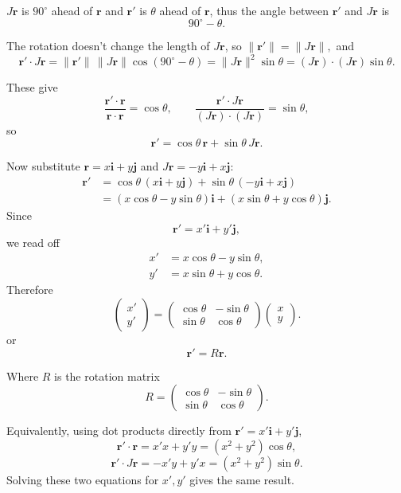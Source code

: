\documentclass[a4paper,11pt]{article}
\begin{document}
\(J\mathbf r\) is \(90^\circ\) ahead of \(\mathbf r\) and
\(\mathbf r'\) is \(\theta\) ahead of \(\mathbf r\), thus
the angle between \(\mathbf r'\) and \(J\mathbf r\) is
\[
90^\circ-\theta.
\]

The rotation doesn't change the length of \(J\mathbf r\), so
\(\|\mathbf r'\| = \|J\mathbf r\|,\) and
\[
\mathbf r'\cdot J\mathbf r
=
\|\mathbf r'\|\,\|J\mathbf r\| \cos(90^\circ-\theta)
=
\|J\mathbf r\|^2 \sin\theta
=
(J\mathbf r)\cdot(J\mathbf r) \sin\theta.
\]

These give
\[
\frac{\mathbf r'\cdot \mathbf r}{\mathbf r\cdot \mathbf r}
=
\cos\theta,
\qquad
\frac{\mathbf r'\cdot J\mathbf r}{(J\mathbf r)\cdot(J\mathbf r)}
=
\sin\theta,
\]
so
\[
\mathbf r'=\cos\theta\,\mathbf r+\sin\theta\,J\mathbf r.
\]

Now substitute \(\mathbf r=x\mathbf i+y\mathbf j\) and \(J\mathbf r=-y\mathbf i+x\mathbf j\):
\[
\begin{aligned}
\mathbf r' &=\cos\theta\,(x\mathbf i+y\mathbf j) +\sin\theta\,(-y\mathbf i+x\mathbf j) \\
           &=(x\cos\theta-y\sin\theta)\mathbf i +(x\sin\theta+y\cos\theta)\mathbf j.
\end{aligned}
\]
Since
\[
\mathbf r'=x'\mathbf i+y'\mathbf j,
\]
we read off
\[
\begin{aligned}
x'&=x\cos\theta-y\sin\theta, \\
y'&=x\sin\theta+y\cos\theta.
\end{aligned}
\]
Therefore
\[
\begin{pmatrix}x'\\ y'\end{pmatrix}
=
\begin{pmatrix}
\cos\theta & -\sin\theta\\
\sin\theta & \cos\theta
\end{pmatrix}
\begin{pmatrix}x\\ y\end{pmatrix}.
\]
or
\[
\mathbf r'
=
R \mathbf r.
\]

Where $R$ is the rotation matrix
\[
R=
\begin{pmatrix}
\cos\theta & -\sin\theta\\
\sin\theta & \cos\theta
\end{pmatrix}.
\]

Equivalently, using dot products directly from \(\mathbf r'=x'\mathbf i+y'\mathbf j\),
\[
\mathbf r'\cdot\mathbf r
=x'x+y'y
=(x^2+y^2)\cos\theta,
\]
\[
\mathbf r'\cdot J\mathbf r
=-x'y+y'x
=(x^2+y^2)\sin\theta.
\]
Solving these two equations for \(x',y'\) gives the same result.
\end{document}
